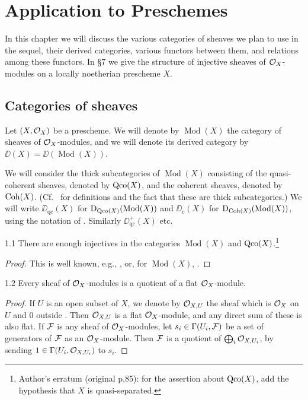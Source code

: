 \chapter{Application to Preschemes}

In this chapter we will discuss the various categories of sheaves we plan to use in the sequel, their derived categories, various functors between them, and relations among these functors. In \S7 we give the structure of injective sheaves of $\mathcal{O}_X$-modules on a locally noetherian prescheme $X$.

\section{Categories of sheaves}\label{sec:2.1}

Let $(X,\mathcal{O}_X)$ be a prescheme. We will denote by $\operatorname{Mod}(X)$ the category of sheaves of $\mathcal{O}_X$-modules, and we will denote its derived category by $\DD(X)=\DD(\operatorname{Mod}(X))$.

We will consider the thick subcategories of $\operatorname{Mod}(X)$ consisting of the quasi-coherent sheaves, denoted by $\operatorname{Qco}(X)$, and the coherent sheaves, denoted by $\operatorname{Coh}(X)$. (Cf.\ \cite[\nopp $0$, \S5]{EGA} for definitions and the fact that these are thick subcategories.) We will write $\DD_{\mathrm{qc}}(X)$ for $\operatorname{D}_{\operatorname{Qco}(X)}(\operatorname{Mod}(X))$ and $\DD_{\mathrm{c}}(X)$ for $\operatorname{D}_{\operatorname{Coh}(X)}(\operatorname{Mod}(X))$, using the notation of . Similarly $\DD_{\mathrm{qc}}^+(X)$ etc.

\begin{bookproposition}{1.1}\label{prop:2.1.1}
There are enough injectives in the categories $\operatorname{Mod}(X)$ and $\operatorname{Qco}(X)$.\footnote{Author's erratum (original p.85): for the assertion about $\operatorname{Qco}(X)$, add the hypothesis that $X$ is quasi-separated.}
\end{bookproposition}

\begin{proof}
This is well known, e.g., \cite[.1]{T}, or, for $\operatorname{Mod}(X)$, \cite[\nopp II,~7.1.1]{G}.
\end{proof}

\begin{bookproposition}{1.2}\label{prop:2.1.2}
Every sheaf of $\mathcal{O}_X$-modules is a quotient of a flat $\mathcal{O}_X$-module.
\end{bookproposition}

\begin{proof}
If $U$ is an open subset of $X$, we denote by $\mathcal{O}_{X,U}$ the sheaf which is $\mathcal{O}_X$ on $U$ and $0$ outside \cite[\nopp II, Thm.~2.9.1]{G}. Then $\mathcal{O}_{X,U}$ is a flat $\mathcal{O}_X$-module, and any direct sum of these is also flat. If $\mathcal{F}$ is any sheaf of $\mathcal{O}_X$-modules, let $s_i\in\Gamma(U_i,\mathcal{F})$ be a set of generators of $\mathcal{F}$ as an $\mathcal{O}_X$-module. Then $\mathcal{F}$ is a quotient of $\bigoplus_i \mathcal{O}_{X,U_i}$, by sending $1\in\Gamma(U_i,\mathcal{O}_{X,U_i})$ to $s_i$.
\end{proof}

